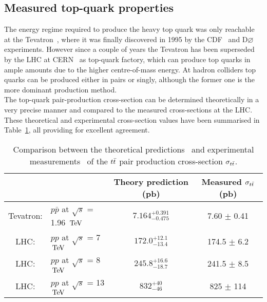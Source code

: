 \subsection{Measured top-quark properties} \label{sec::SubTop}
The energy regime required to produce the heavy top quark was only reachable at the Tevatron~\cite{Tevatron}, where it was finally discovered in 1995 by the CDF~\cite{CDF} and D$\varnothing$~\cite{D0} experiments. However since a couple of years the Tevatron has been superseded by the LHC at CERN~\cite{CERN} as top-quark factory, which can produce top quarks in ample amounts due to the higher centre-of-mass energy. %
At hadron colliders top quarks can be produced either in pairs or singly, although the former one is the more dominant production method.
\\
The top-quark pair-production cross-section can be determined theoretically in a very precise manner and compared to the measured cross-sections at the LHC. These theoretical and experimental cross-section values have been summarised in Table~\ref{table::XSTopPair}, all providing for excellent agreement. %
\begin{table}[h!t]
 \centering
 \caption{Comparison between the theoretical predictions~\cite{CzakonTopPairXS, CzakonGluonPDF} and experimental measurements~\cite{TevatronTTbarXS, CMSTTbarXS, CMS-PAS-TOP-14-016, ATLAS-CONF-2015-033} of the $t\bar{t}$ pair production cross-section $\sigma_{t\bar{t}}$.} \label{table::XSTopPair}
 \begin{tabular}{|cl|c|c|}
  \hline
		&						& Theory prediction (pb) 	& Measured $\sigma_{t\bar{t}}$ (pb) 	\\
  \hline						
  Tevatron: 	& $p\bar{p}$ at $\sqrt{s}$ = 1.96 $\, \mathrm{TeV}$ 	& $7.164^{+0.391}_{-0.475}$	& 7.60 $\pm$ 0.41			\\
  LHC: 		& $pp$ at $\sqrt{s}$ = 7 $\, \mathrm{TeV}$ 		& $172.0^{+12.1}_{-13.4}$	& 174.5 $\pm$ 6.2			\\
  LHC: 		& $pp$ at $\sqrt{s}$ = 8 $\, \mathrm{TeV}$ 		& $245.8^{+16.6}_{-18.7}$	& 241.5 $\pm$ 8.5			\\
  LHC: 		& $pp$ at $\sqrt{s}$ = 13 $\, \mathrm{TeV}$ 		& $832^{+40}_{-46}$		& 825 $\pm$ 114				\\
  \hline
 \end{tabular}
\end{table}


